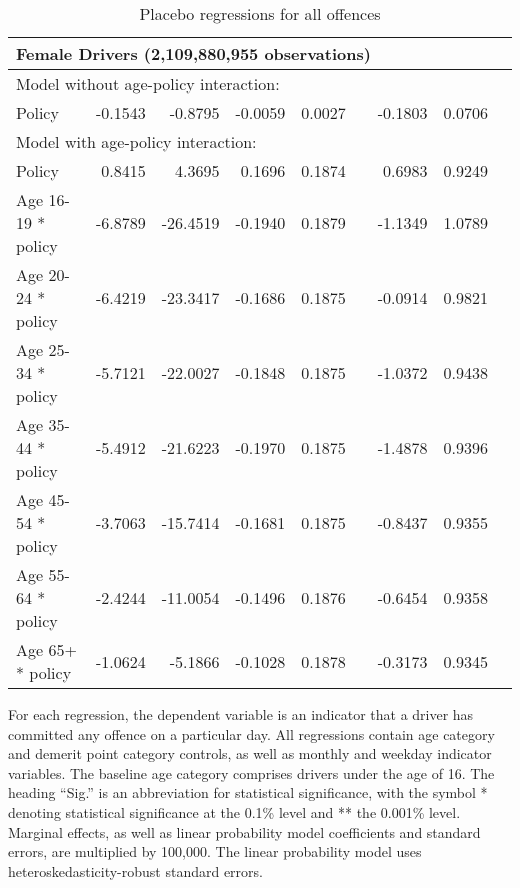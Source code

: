 \begin{table}
\begin{tabular}{l r r r r l r r l}
\hline 

\multicolumn{8}{l}{\textbf{Female Drivers} (2,109,880,955  observations)} \\ 

\hline
\multicolumn{8}{l}{Model without age-policy interaction: } \\ 
Policy                   &  -0.1543        &  -0.8795       &  -0.0059        &  0.0027       &            &  -0.1803        &  0.0706       &            \\ 
\hline
\multicolumn{8}{l}{Model with age-policy interaction: } \\ 
Policy                   &  0.8415        &  4.3695       &  0.1696        &  0.1874       &            &  0.6983        &  0.9249       &            \\ 
Age 16-19 * policy   &  -6.8789        &  -26.4519       &  -0.1940        &  0.1879       &            &  -1.1349        &  1.0789       &            \\ 
Age 20-24 * policy   &  -6.4219        &  -23.3417       &  -0.1686        &  0.1875       &            &  -0.0914        &  0.9821       &            \\ 
Age 25-34 * policy   &  -5.7121        &  -22.0027       &  -0.1848        &  0.1875       &            &  -1.0372        &  0.9438       &            \\ 
Age 35-44 * policy   &  -5.4912        &  -21.6223       &  -0.1970        &  0.1875       &            &  -1.4878        &  0.9396       &            \\ 
Age 45-54 * policy   &  -3.7063        &  -15.7414       &  -0.1681        &  0.1875       &            &  -0.8437        &  0.9355       &            \\ 
Age 55-64 * policy   &  -2.4244        &  -11.0054       &  -0.1496        &  0.1876       &            &  -0.6454        &  0.9358       &            \\ 
Age 65+ * policy   &  -1.0624        &  -5.1866       &  -0.1028        &  0.1878       &            &  -0.3173        &  0.9345       &            \\ 

\hline 

\end{tabular} 
\caption{Placebo regressions for all offences} 
For each regression, the dependent variable is an indicator that a driver has committed  
any offence on a particular day.  
All regressions contain age category and demerit point category controls, 
as well as monthly and weekday indicator variables. 
The baseline age category comprises drivers under the age of 16. 
The heading ``Sig.'' is an abbreviation for statistical significance, with 
the symbol * denoting statistical significance at the 0.1\% level 
and ** the 0.001\% level. 
Marginal effects, as well as linear probability model coefficients and standard errors, are  
multiplied by 100,000.  
The linear probability model uses heteroskedasticity-robust standard errors. 
\label{tab:seas_Logit_vs_LPMx100K_placebo_regs} 
\end{table} 
 

